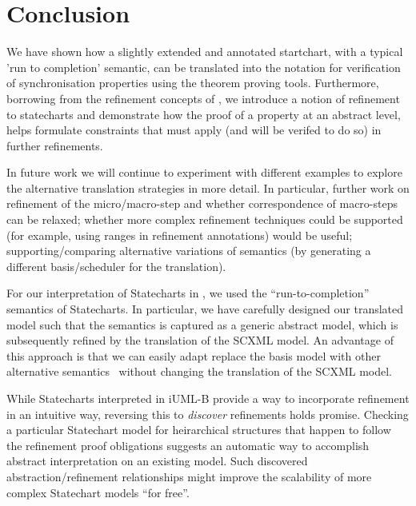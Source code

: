 
\section{Conclusion}
\label{sec:conclusion}
We have shown how a slightly extended and annotated startchart, with a typical 'run to completion' semantic, can be translated into the \EventB notation for verification of synchronisation properties using the \EventB theorem proving tools.
Furthermore, borrowing from the refinement concepts of \EventB, we introduce a notion of refinement to statecharts and demonstrate how the proof of a property at an abstract level, helps formulate constraints that must apply (and will be verifed to do so) in further refinements.

In future work we will continue to experiment with different examples to explore the alternative translation strategies in more detail. 
In particular, further work on refinement of the micro/macro-step and whether correspondence of macro-steps can be relaxed; whether more complex refinement techniques could be supported (for example, using ranges in refinement annotations) would be useful; supporting/comparing alternative variations of semantics (by generating a different basis/scheduler for the translation).

For our interpretation of Statecharts in \mbox{\iUMLB}, we used the ``run-to-completion'' semantics of Statecharts.  In particular, we have carefully designed our translated model such that the semantics is captured as a generic abstract model, which is subsequently refined by the translation of the SCXML model.  An advantage of this approach is that we can easily adapt replace the basis model with other alternative semantics~\mbox{\cite{Eshuis_2009}} without changing the translation of the SCXML model. 

While Statecharts interpreted in iUML-B provide a way to incorporate refinement in an intuitive way, reversing this to \emph{discover} refinements holds promise. 
Checking a particular Statechart model for heirarchical structures that happen to follow the refinement proof obligations suggests an automatic way to accomplish abstract interpretation on an existing model.  
Such discovered abstraction/refinement relationships might improve the scalability of more complex Statechart models ``for free''.
